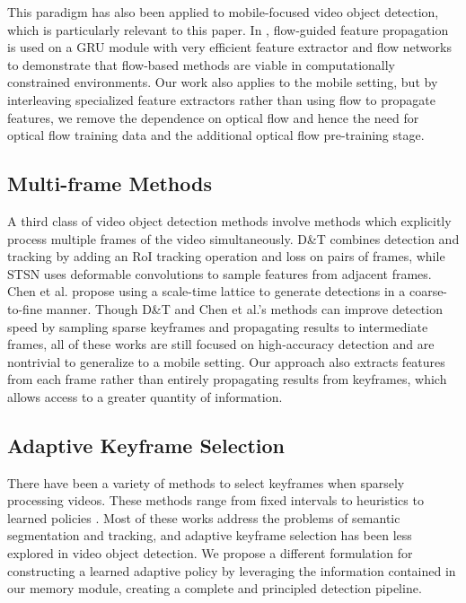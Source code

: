 \documentclass[10pt,twocolumn,letterpaper]{article}
\begin{document}
This paradigm has also been applied to mobile-focused video object detection, which is particularly relevant to this paper. In \cite{zhu2018towardsmobile}, flow-guided feature propagation is used on a GRU module with very efficient feature extractor and flow networks to demonstrate that flow-based methods are viable in computationally constrained environments. Our work also applies to the mobile setting, but by interleaving specialized feature extractors rather than using flow to propagate features, we remove the dependence on optical flow and hence the need for optical flow training data and the additional optical flow pre-training stage.

\subsection{Multi-frame Methods}
A third class of video object detection methods involve methods which explicitly process multiple frames of the video simultaneously. D\&T \cite{feichtenhofer2017detect} combines detection and tracking by adding an RoI tracking operation and loss on pairs of frames, while STSN \cite{bertasius2018object} uses deformable convolutions to sample features from adjacent frames. Chen et al. \cite{chen2018optimizing} propose using a scale-time lattice to generate detections in a coarse-to-fine manner. Though D\&T and Chen et al.'s methods can improve detection speed by sampling sparse keyframes and propagating results to intermediate frames, all of these works are still focused on high-accuracy detection and are nontrivial to generalize to a mobile setting. Our approach also extracts features from each frame rather than entirely propagating results from keyframes, which allows access to a greater quantity of information. 

\subsection{Adaptive Keyframe Selection}
There have been a variety of methods to select keyframes when sparsely processing videos. These methods range from fixed intervals \cite{ZhuX1, zhu2018towardsmobile} to heuristics \cite{zhu2018towards, li2018low} to learned policies \cite{li2017dynamic, mahasseni2017budget, supancic2017tracking, huang2017learning, ying2017depth}. Most of these works address the problems of semantic segmentation and tracking, and adaptive keyframe selection has been less explored in video object detection. We propose a different formulation for constructing a learned adaptive policy by leveraging the information contained in our memory module, creating a complete and principled detection pipeline.
\end{document}
